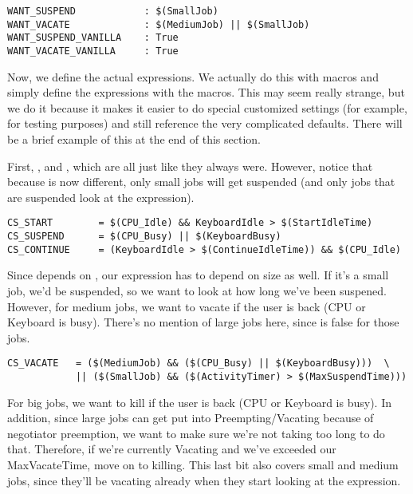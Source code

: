 \begin{verbatim}
WANT_SUSPEND            : $(SmallJob)
WANT_VACATE             : $(MediumJob) || $(SmallJob)
WANT_SUSPEND_VANILLA    : True
WANT_VACATE_VANILLA     : True
\end{verbatim}

Now, we define the actual expressions.  We actually do this with
macros and simply define the expressions with the macros.  This may
seem really strange, but we do it because it makes it easier to do
special customized settings (for example, for testing purposes) and still
reference the very complicated defaults.  There will be a brief
example of this at the end of this section. 

First, ,  and , which are all
just like they always were.  However, notice that because
 is now different, only small jobs will get
suspended (and only jobs that are suspended look at the
 expression).

\begin{verbatim}
CS_START        = $(CPU_Idle) && KeyboardIdle > $(StartIdleTime)
CS_SUSPEND      = $(CPU_Busy) || $(KeyboardBusy)
CS_CONTINUE     = (KeyboardIdle > $(ContinueIdleTime)) && $(CPU_Idle)
\end{verbatim}

Since  depends on , our
 expression has to depend on size as well.  If it's a
small job, we'd be suspended, so we want to look at how long we've
been suspened.  However, for medium jobs, we want to vacate if the
user is back (CPU or Keyboard is busy).  There's no mention of large
jobs here, since  is false for those jobs.

\begin{verbatim}
CS_VACATE   = ($(MediumJob) && ($(CPU_Busy) || $(KeyboardBusy)))  \
            || ($(SmallJob) && ($(ActivityTimer) > $(MaxSuspendTime)))
\end{verbatim}

For big jobs, we want to kill if the user is back (CPU or Keyboard
is busy).  In addition, since large jobs can get put into
Preempting/Vacating because of negotiator preemption, we want to make
sure we're not taking too long to do that.  Therefore, if we're
currently Vacating and we've exceeded our MaxVacateTime, move on to
killing.  This last bit also covers small and medium jobs, since
they'll be vacating already when they start looking at the 
expression. 

